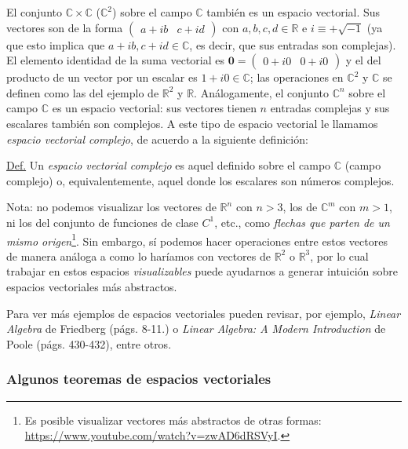 \documentclass[12pt,dvipsnames]{article}
\begin{document}
El conjunto $\mathbb{C}\times\mathbb{C}$ ($\mathbb{C}^2$) sobre el campo $\mathbb{C}$ también es un espacio vectorial. Sus vectores son de la forma $\begin{pmatrix}a+ib&c+id\end{pmatrix}$ con $a,b,c,d\in\mathbb{R}$ e $i\equiv+\sqrt{-1}$ (ya que esto implica que $a+ib, c+id\in\mathbb{C}$, es decir, que sus entradas son complejas). El elemento identidad de la suma vectorial es $\mathbf{0}=\begin{pmatrix}0+i0&0+i0\end{pmatrix}$ y el del producto de un vector por un escalar es $1 + i0\in\mathbb{C}$; las operaciones en $\mathbb{C}^2$ y $\mathbb{C}$ se definen como las del ejemplo de $\mathbb{R}^2$ y $\mathbb{R}$. Análogamente, el conjunto $\mathbb{C}^n$ sobre el campo $\mathbb{C}$ es un espacio vectorial: sus vectores tienen $n$ entradas complejas y sus escalares también son complejos. A este tipo de espacio vectorial le llamamos \textit{espacio vectorial complejo}, de acuerdo a la siguiente definición:

\vspace{1.5mm} 
\begin{tcolorbox}
\underline{Def.} Un \textit{espacio vectorial complejo} es aquel definido sobre el campo $\mathbb{C}$ (campo complejo) o, equivalentemente, aquel donde los escalares son números complejos.
\end{tcolorbox}{}

Nota: no podemos visualizar los vectores de $\mathbb{R}^n$ con $n>3$, los de $\mathbb{C}^m$ con $m>1$, ni los del conjunto de funciones de clase $C^1$, etc., como \emph{flechas que parten de un mismo origen}\footnote{Es posible visualizar vectores más abstractos de otras formas: \url{https://www.youtube.com/watch?v=zwAD6dRSVyI}.}. Sin embargo, sí podemos hacer operaciones entre estos vectores de manera análoga a como lo haríamos con vectores de $\mathbb{R}^2$ o $\mathbb{R}^3$, por lo cual trabajar en estos espacios \emph{visualizables} puede ayudarnos a generar intuición sobre espacios vectoriales más abstractos.

\vspace{3mm}
Para ver más ejemplos de espacios vectoriales pueden revisar, por ejemplo, \textit{Linear Algebra} de Friedberg (págs. 8-11.) o \textit{Linear Algebra: A Modern Introduction} de Poole (págs. 430-432), entre otros.

\subsubsection{Algunos teoremas de espacios vectoriales} \label{Teo:Espacios_vectoriales} 
\end{document}
